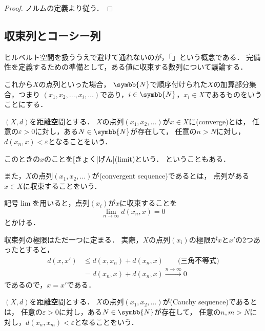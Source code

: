\documentclass{sotsu}
\begin{document}
\begin{proof}
    ノルムの定義より従う．
\end{proof}




\subsection{収束列とコーシー列}

ヒルベルト空間を扱ううえで避けて通れないのが，「」という概念である．
完備性を定義するための準備として，ある値に収束する数列について議論する．

これから$X$の点列といった場合，
$\symbb{N}$で順序付けられた$X$の加算部分集合，つまり
$(x_1, x_2, \dots, x_i, \dotsc)$であり，$i \in \symbb{N}$，$x_i \in X$であるものをいうことにする．

\begin{definition}[収束列]
    \label{dfn:convergent-sequence}
    $(X, d)$を距離空間とする．
    $X$の点列$(x_1, x_2, \dotsc)$が$x \in X$に(converge)とは，
    任意の$\varepsilon > 0$に対し，ある$N \in \symbb{N}$が存在して，
    任意の$n > N$に対し，$d(x_n, x) < \varepsilon$となることをいう．
    
    このときの$x$のことを[きょく|げん](limit)という．
    ということもある．

    また，$X$の点列$(x_1, x_2, \dotsc)$が(convergent sequence)であるとは，
    点列がある$x \in X$に収束することをいう．
\end{definition}

記号$\lim$を用いると，点列$(x_i)$が$x$に収束することを
\[  \lim_{n \to \infty} d(x_n, x) = 0  \]
とかける．

収束列の極限はただ一つに定まる．
実際，$X$の点列$(x_i)$の極限が$x$と$x'$の2つあったとすると，
\begin{equation*}
    \begin{split}
        d(x, x') &\leq d(x, x_n) + d(x_n, x)  \qquad \text{(三角不等式)}  \\
            &= d(x_n, x) + d(x_n, x)  
            \xrightarrow{n \to \infty} 0
    \end{split}
\end{equation*}
であるので，$x = x'$である．


\begin{definition}[コーシー列]
    \label{dfn:Cauchy-sequence}
    $(X, d)$を距離空間とする．
    $X$の点列$(x_1, x_2, \dotsc)$が(Cauchy sequence)であるとは，
    任意の$\varepsilon > 0$に対し，ある$N \in \symbb{N}$が存在して，
    任意の$n, m > N$に対し，$ d(x_n, x_m) < \varepsilon $となることをいう．
\end{definition}
\end{document}
